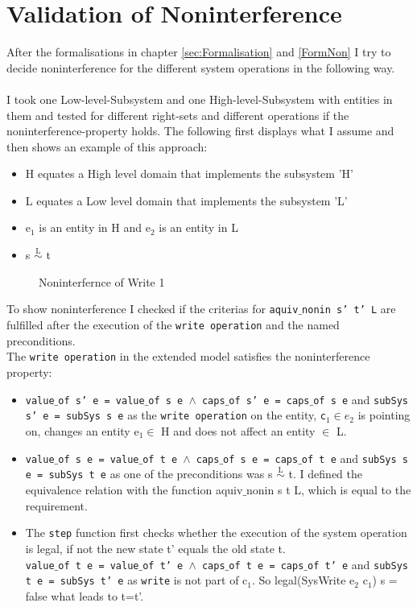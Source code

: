 \section{Validation of Noninterference}\label{ValNon}
After the formalisations in chapter \ref{sec:Formalisation} and \ref{FormNon} I try to decide noninterference for the different system operations in the following way.\\ \\
I took one Low-level-Subsystem and one High-level-Subsystem with entities in them and tested for different right-sets and different operations if the noninterference-property holds. The following first displays what I assume and then shows an example of this approach: \\ 
\begin{itemize}
\item H equates a High level domain that implements the subsystem 'H'
\item L equates a Low level domain that implements the subsystem 'L'
\item e$_1$ is an entity in H and e$_2$ is an entity in L
\item s $\overset{\text{L}}{\sim}$ t
\end{itemize}
\begin{figure}[H]
\caption{Noninterfernce of Write 1}
\end{figure}
To show noninterference I checked if the criterias for \texttt{aquiv$\_$nonin s' t' L} are fulfilled after the execution of the \texttt{write operation} and the named preconditions. \\ 
The \texttt{write operation} in the extended model satisfies the noninterference property: 
\begin{itemize}
\item \texttt{value$\_$of s' e = value$\_$of s e $\wedge$ caps$\_$of s' e = caps$\_$of s e} and \texttt{subSys s' e = subSys s e} as the \texttt{write operation} on the entity, \texttt{c$_1 \in e_2$} is pointing on, changes an entity e$_1 \in$ H and does not affect an entity $\in$ L.
\item \texttt{value$\_$of s e = value$\_$of t e $\wedge$ caps$\_$of s e = caps$\_$of t e} and \texttt{subSys s e = subSys t e} as one of the preconditions was s $\overset{\text{L}}{\sim}$ t. I defined the equivalence relation with the function aquiv$\_$nonin s t L, which is equal to the requirement. 
\item The \texttt{step} function first checks whether the execution of the system operation is legal, if not the new state t' equals the old state t. \\
\texttt{value$\_$of t e = value$\_$of t' e $\wedge$ caps$\_$of t e = caps$\_$of t' e} and \texttt{subSys t e = subSys t' e} as \texttt{write} is not part of c$_1$. So legal(SysWrite e$_2$ c$_1$) s = false what leads to t=t'. \\
\end{itemize} 
